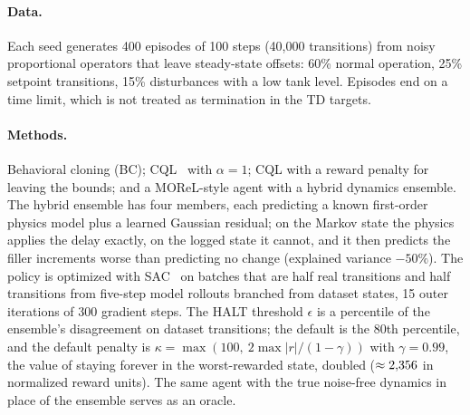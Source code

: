 \documentclass[11pt]{article}
\begin{document}
\paragraph{Data.} Each seed generates 400 episodes of 100 steps (40{,}000 transitions) from noisy proportional operators that leave steady-state offsets: 60\% normal operation, 25\% setpoint transitions, 15\% disturbances with a low tank level. Episodes end on a time limit, which is not treated as termination in the TD targets.

\paragraph{Methods.} Behavioral cloning (BC); CQL~\citep{kumar2020cql} with $\alpha=1$; CQL with a reward penalty for leaving the bounds; and a MOReL-style agent with a hybrid dynamics ensemble. The hybrid ensemble has four members, each predicting a known first-order physics model plus a learned Gaussian residual; on the Markov state the physics applies the delay exactly, on the logged state it cannot, and it then predicts the filler increments worse than predicting no change (explained variance $-50\%$). The policy is optimized with SAC~\citep{haarnoja2018sac} on batches that are half real transitions and half transitions from five-step model rollouts branched from dataset states, 15 outer iterations of 300 gradient steps. The HALT threshold $\epsilon$ is a percentile of the ensemble's disagreement on dataset transitions; the default is the 80th percentile, and the default penalty is $\kappa = \max(100,\ 2\max|r|/(1-\gamma))$ with $\gamma=0.99$, the value of staying forever in the worst-rewarded state, doubled ($\approx2{,}356$ in normalized reward units). The same agent with the true noise-free dynamics in place of the ensemble serves as an oracle.
\end{document}
